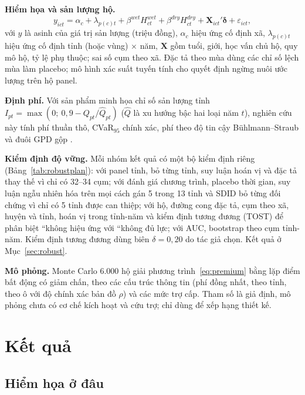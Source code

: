 \documentclass[12pt,a4paper]{article}
\begin{document}
\textbf{Hiểm họa và sản lượng hộ.}
\begin{equation}
y_{ict} = \alpha_c + \lambda_{p(c)t} + \beta^{wet} H^{wet}_{ct} + \beta^{dry} H^{dry}_{ct} + \bm{X}_{ict}'\bm\delta + \varepsilon_{ict},
\label{eq:hh}
\end{equation}
với $y$ là asinh của giá trị sản lượng (triệu đồng), $\alpha_c$ hiệu ứng cố định xã, $\lambda_{p(c)t}$ hiệu ứng cố định tỉnh (hoặc vùng) $\times$ năm, $\bm{X}$ gồm tuổi, giới, học vấn chủ hộ, quy mô hộ, tỷ lệ phụ thuộc; sai số cụm theo xã. Đặc tả theo mùa dùng các chỉ số lệch mùa làm placebo; mô hình xác suất tuyến tính cho quyết định ngừng nuôi ước lượng trên hộ panel.

\textbf{Định phí.} Với sản phẩm minh họa chỉ số sản lượng tỉnh $I_{pt} = \max(0;\ 0{,}9 - Q_{pt}/\hat Q_{pt})$ ($\hat Q$ là xu hướng bậc hai loại năm $t$), nghiên cứu này tính phí thuần thô, CVaR$_{95}$ chính xác, phí theo độ tin cậy Bühlmann--Straub \parencite{buhlmann2005} và đuôi GPD gộp \parencite{embrechts1997,mcneil2015,acerbi2002}.

\textbf{Kiểm định độ vững.} Mỗi nhóm kết quả có một bộ kiểm định riêng (Bảng~\ref{tab:robustplan}): với panel tỉnh, bỏ từng tỉnh, suy luận hoán vị và đặc tả thay thế vì chỉ có 32--34 cụm; với đánh giá chương trình, placebo thời gian, suy luận ngẫu nhiên hóa trên mọi cách gán 5 trong 13 tỉnh và SDID bỏ từng đối chứng vì chỉ có 5 tỉnh được can thiệp; với hộ, đường cong đặc tả, cụm theo xã, huyện và tỉnh, hoán vị trong tỉnh-năm và kiểm định tương đương (TOST) để phân biệt ``không hiệu ứng với ``không đủ lực; với AUC, bootstrap theo cụm tỉnh-năm. Kiểm định tương đương dùng biên $\delta=0{,}20$ do tác giả chọn. Kết quả ở Mục~\ref{sec:robust}.

\textbf{Mô phỏng.}  Monte Carlo 6.000 hộ giải phương trình~\eqref{eq:premium} bằng lặp điểm bất động có giảm chấn, theo các cấu trúc thông tin (phí đồng nhất, theo tỉnh, theo ô với độ chính xác bản đồ $\rho$) và các mức trợ cấp. Tham số là giả định, mô phỏng chưa có cơ chế kích hoạt và cứu trợ; chỉ dùng để xếp hạng thiết kế.

\section{Kết quả}
\label{sec:results}

\subsection{Hiểm họa ở đâu}
\end{document}
